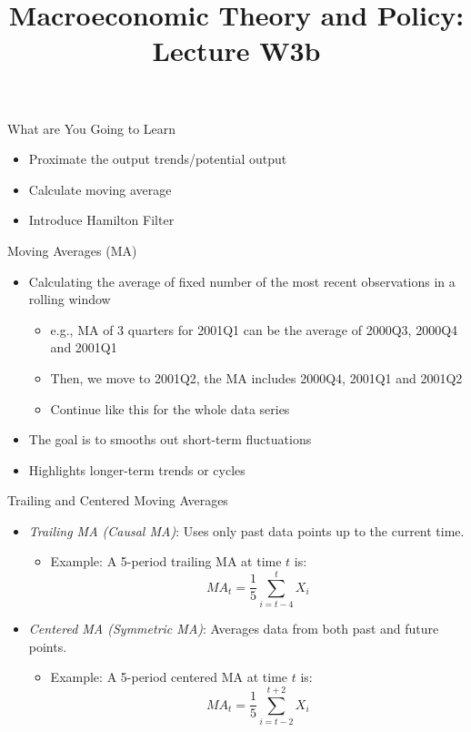 \documentclass[aspectratio=1610]{beamer}
\title[Winter - Lecture 3b] %
{Macroeconomic Theory and Policy: Lecture  W3b }
\author[University of Toronto] %
{}
\date[] %
\begin{document}
\begin{frame}
  \titlepage
\end{frame}

\begin{frame}[wide]{What are You Going to Learn }
	\begin{itemize}
		\item Proximate the output trends/potential output
		\item Calculate moving average
		\item Introduce Hamilton Filter
	\end{itemize}
\end{frame}

\begin{frame}[wide]{Moving Averages (MA)}
	\begin{itemize}
		\item Calculating the average of fixed number of the most recent observations in a rolling window
		\vspace{2mm}
		\begin{itemize}
			\item e.g., MA of 3 quarters for 2001Q1 can be the average of 2000Q3, 2000Q4 and 2001Q1
			\item Then, we move to 2001Q2, the MA includes 2000Q4, 2001Q1 and 2001Q2
			\item Continue like this for the whole data series
		\end{itemize}
		\item The goal is to smooths out short-term fluctuations
		\item Highlights longer-term trends or cycles
	\end{itemize}
\end{frame}

\begin{frame}[wide]{Trailing and Centered Moving Averages}
	\begin{itemize}
		\item \textit{Trailing MA (Causal MA)}: Uses only past data points up to the current time.
		\begin{itemize}
			\item Example: A 5-period trailing MA at time \( t \) is:  
		\[
		MA_t = \frac{1}{5} \sum_{i=t-4}^{t} X_i
		\]
		\end{itemize}
		\item \textit{Centered MA (Symmetric MA)}: Averages data from both past and future points.
		\begin{itemize}
			\item Example: A 5-period centered MA at time \( t \) is:
		\[
		MA_t = \frac{1}{5} \sum_{i=t-2}^{t+2} X_i
		\]
		\end{itemize}
	\end{itemize}
\end{frame}
\end{document}
